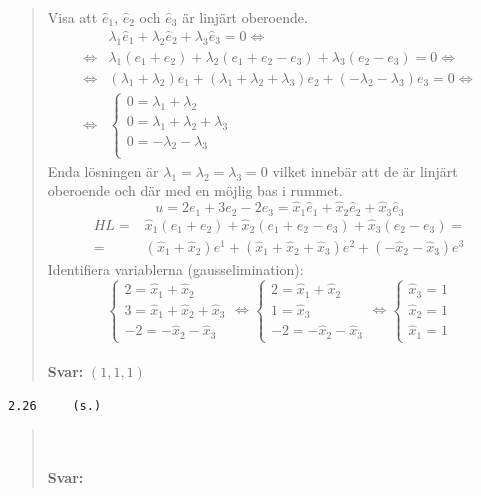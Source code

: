 \documentclass[a4paper]{article}
\newcommand{\tskcol}[1]{\textcolor{tskcol}{#1}}
\begin{document}
\begin{quotation}
	\noindent
	Visa att $\hat{e}_1$, $\hat{e}_2$ och $\hat{e}_3$ är linjärt oberoende.
	\begin{align*}
	&\lambda_1\hat{e}_1+\lambda_2\hat{e}_2+\lambda_3\hat{e}_3=0 \Leftrightarrow \\ \Leftrightarrow
	&\lambda_1(e_1+e_2)+\lambda_2(e_1+e_2-e_3)+\lambda_3(e_2-e_3)=0 \Leftrightarrow \\ \Leftrightarrow
	&(\lambda_1+\lambda_2)e_1+(\lambda_1+\lambda_2+\lambda_3)e_2+(-\lambda_2-\lambda_3)e_3=0 \Leftrightarrow \\ \Leftrightarrow
	&\begin{cases}
	0=\lambda_1+\lambda_2 \\
	0=\lambda_1+\lambda_2+\lambda_3 \\
	0=-\lambda_2-\lambda_3 \\
	\end{cases}
	\end{align*}
	Enda lösningen är $\lambda_1=\lambda_2=\lambda_3=0$ vilket innebär att de är linjärt oberoende och där med en möjlig bas i rummet.
	\[u=2e_1+3e_2-2e_3=\hat{x}_1\hat{e}_1+\hat{x}_2\hat{e}_2+\hat{x}_3\hat{e}_3\]
	\begin{align*}
	HL=&\hat{x}_1(e_1+e_2)+\hat{x}_2(e_1+e_2-e_3)+\hat{x}_3(e_2-e_3)= \\ =
	&(\hat{x}_1+\hat{x}_2)e^1+(\hat{x}_1+\hat{x}_2+\hat{x}_3)e^2+(-\hat{x}_2-\hat{x}_3)e^3
	\end{align*}
	Identifiera variablerna (gausselimination):
	\[\begin{cases}
	2=\hat{x}_1+\hat{x}_2 \\
	3=\hat{x}_1+\hat{x}_2+\hat{x}_3 \\
	-2=-\hat{x}_2-\hat{x}_3
	\end{cases} \Leftrightarrow
	\begin{cases}
	2=\hat{x}_1+\hat{x}_2 \\
	1=\hat{x}_3 \\
	-2=-\hat{x}_2-\hat{x}_3
	\end{cases} \Leftrightarrow
	\begin{cases}
	\hat{x}_3=1 \\
	\hat{x}_2=1 \\
	\hat{x}_1=1
	\end{cases}
	\]
	\\
	\textbf{Svar:} $(1,1,1)$
\end{quotation}

\texttt{\tskcol{2.26~~~~ (s.)}}
\begin{quotation}
	\noindent
	\\ \\
	\textbf{Svar:}
\end{quotation}
\end{document}
